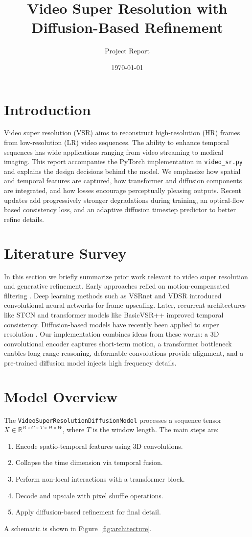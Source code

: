 \documentclass{article}
\title{Video Super Resolution with Diffusion-Based Refinement}
\author{Project Report}
\date{\today}
\begin{document}
\maketitle
\tableofcontents
\newpage
\section{Introduction}
Video super resolution (VSR) aims to reconstruct high-resolution (HR) frames from low-resolution (LR) video sequences. The ability to enhance temporal sequences has wide applications ranging from video streaming to medical imaging. This report accompanies the PyTorch implementation in \texttt{video\_sr.py} and explains the design decisions behind the model. We emphasize how spatial and temporal features are captured, how transformer and diffusion components are integrated, and how losses encourage perceptually pleasing outputs.
Recent updates add progressively stronger degradations during training, an optical-flow based consistency loss, and an adaptive diffusion timestep predictor to better refine details.

\section{Literature Survey}
In this section we briefly summarize prior work relevant to video super resolution and generative refinement. Early approaches relied on motion-compensated filtering \cite{Tekalp1995}. Deep learning methods such as VSRnet \cite{Kappeler2016} and VDSR \cite{Kim2016} introduced convolutional neural networks for frame upscaling. Later, recurrent architectures like STCN \cite{Dai2017} and transformer models like BasicVSR++ \cite{Chan2022} improved temporal consistency. Diffusion-based models have recently been applied to super resolution \cite{Saharia2022}. Our implementation combines ideas from these works: a 3D convolutional encoder captures short-term motion, a transformer bottleneck enables long-range reasoning, deformable convolutions provide alignment, and a pre-trained diffusion model injects high frequency details.

\section{Model Overview}
The \texttt{VideoSuperResolutionDiffusionModel} processes a sequence tensor $X \in \mathbb{R}^{B\times C\times T\times H\times W}$, where $T$ is the window length. The main steps are:
\begin{enumerate}
\item Encode spatio-temporal features using 3D convolutions.
\item Collapse the time dimension via temporal fusion.
\item Perform non-local interactions with a transformer block.
\item Decode and upscale with pixel shuffle operations.
\item Apply diffusion-based refinement for final detail.
\end{enumerate}
A schematic is shown in Figure~\ref{fig:architecture}.
\end{document}

